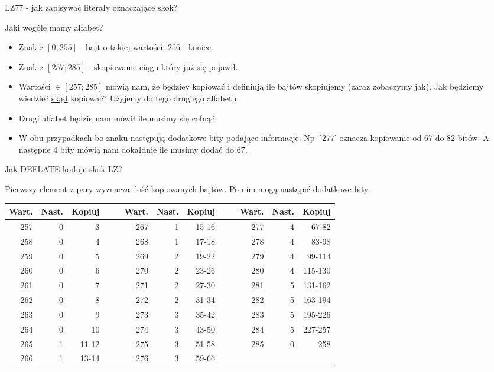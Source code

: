 \documentclass[presentation]{beamer}
\begin{document}
\begin{frame}[label={sec:org57752d0}]{LZ77 - jak zapisywać literały oznaczające skok?}
\begin{block}{Jaki wogóle mamy alfabet?}
\begin{itemize}
\item Znak z \([0; 255]\) - bajt o takiej wartości, \(256\) - koniec.
\item Znak z \([257; 285]\)  - skopiowanie ciągu który już się pojawił.
\item Wartości \(\in [257; 285]\) mówią nam, że będziey kopiować i definiują ile
bajtów skopiujemy (zaraz zobaczymy jak). Jak będziemy wiedzieć \uline{skąd}
kopiować? Użyjemy do tego drugiego alfabetu.
\item Drugi alfabet będzie nam mówił ile musimy się cofnąć.
\item W obu przypadkach bo znaku następują dodatkowe bity podające
informacje. Np. '277' oznacza kopiowanie od 67 do 82 bitów. A
następne 4 bity mówią nam dokałdnie ile musimy dodać do 67.
\end{itemize}
\end{block}
\end{frame}


\begin{frame}[label={sec:org23c4dfc}]{Jak DEFLATE koduje skok LZ?}
\begin{block}{Pierwszy element z pary wyznacza ilość kopiowanych bajtów. Po nim mogą nastąpić dodatkowe bity.}
{\tiny
\begin{center}
\begin{tabular}{rrrllrrrllrrr}
Wart. & Nast. & Kopiuj &  &  & Wart. & Nast. & Kopiuj &  &  & Wart. & Nast. & Kopiuj\\
\hline
257 & 0 & 3 &  &  & 267 & 1 & 15-16 &  &  & 277 & 4 & 67-82\\
258 & 0 & 4 &  &  & 268 & 1 & 17-18 &  &  & 278 & 4 & 83-98\\
259 & 0 & 5 &  &  & 269 & 2 & 19-22 &  &  & 279 & 4 & 99-114\\
260 & 0 & 6 &  &  & 270 & 2 & 23-26 &  &  & 280 & 4 & 115-130\\
261 & 0 & 7 &  &  & 271 & 2 & 27-30 &  &  & 281 & 5 & 131-162\\
262 & 0 & 8 &  &  & 272 & 2 & 31-34 &  &  & 282 & 5 & 163-194\\
263 & 0 & 9 &  &  & 273 & 3 & 35-42 &  &  & 283 & 5 & 195-226\\
264 & 0 & 10 &  &  & 274 & 3 & 43-50 &  &  & 284 & 5 & 227-257\\
265 & 1 & 11-12 &  &  & 275 & 3 & 51-58 &  &  & 285 & 0 & 258\\
266 & 1 & 13-14 &  &  & 276 & 3 & 59-66 &  &  &  &  & \\
\end{tabular}
\end{center}
}
\end{block}
\end{frame}
\end{document}
